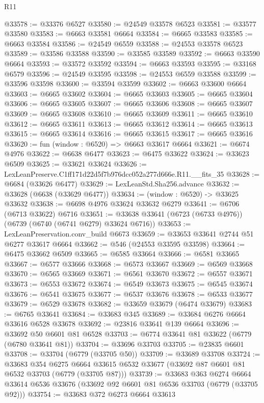 \begin{lexlean}{R11}
\begin{coremodule}
@33578 := @33376 @6527
@33580 := @24549 @33578 @6523
@33581 := @33577 @33580
@33583 := @6663 @33581 @6664
@33584 := @6665 @33583
@33585 := @6663 @33584
@33586 := @24549 @6559
@33588 := @24553 @33578 @6523
@33589 := @33586 @33588
@33590 := @33585 @33589
@33592 := @6663 @33590 @6664
@33593 := @33572 @33592
@33594 := @6663 @33593
@33595 := @33168 @6579
@33596 := @24549 @33595
@33598 := @24553 @6559 @33588
@33599 := @33596 @33598
@33600 := @33594 @33599
@33602 := @6663 @33600 @6664
@33603 := @6665 @33602
@33604 := @6665 @33603
@33605 := @6665 @33604
@33606 := @6665 @33605
@33607 := @6665 @33606
@33608 := @6665 @33607
@33609 := @6665 @33608
@33610 := @6665 @33609
@33611 := @6665 @33610
@33612 := @6665 @33611
@33613 := @6665 @33612
@33614 := @6665 @33613
@33615 := @6665 @33614
@33616 := @6665 @33615
@33617 := @6665 @33616
@33620 := fun (window : @6520) => @6663 @33617 @6664
@33621 := @6674 @4976
@33622 := @6638 @6477
@33623 := @6475 @33622
@33624 := @33623 @6509
@33625 := @33621 @33624
@33626 := LexLeanPreserve.C1ff171d22d5f7b976dcc052a277d666e.R11.__fits_35
@33628 := @6684 (@33626 @6477)
@33629 := LexLeanStd.Sha256.advance
@33632 := @33628 (@6638 (@33629 @6477))
@33634 := (window : @6520) -> @33625 @33632
@33638 := @6698 @4976 @33624 @33632 @6279
@33641 := @6706 (@6713 @33622) @6716
@33651 := @33638 @33641 (@6723 (@6733 @4976)) (@6739 (@6740 (@6741 @6279) @33624 @6716))
@33653 := LexLeanPreservation.conv_build @6673
@33659 := @33653 @33641 @2744 @51 @6277 @33617 @6664
@33662 := @546 (@24553 @33595 @33598)
@33664 := @6475 @33662 @6509
@33665 := @6585 @33664
@33666 := @6581 @33665
@33667 := @6577 @33666
@33668 := @6573 @33667
@33669 := @6569 @33668
@33670 := @6565 @33669
@33671 := @6561 @33670
@33672 := @6557 @33671
@33673 := @6553 @33672
@33674 := @6549 @33673
@33675 := @6545 @33674
@33676 := @6541 @33675
@33677 := @6537 @33676
@33678 := @6533 @33677
@33679 := @6529 @33678
@33682 := @33659 @33679 (@6474 @33679)
@33683 := @6765 @33641
@33684 := @33683 @345
@33689 := @33684 @6276 @6664 @33616 @6528 @33678
@33692 := @23816 @33641 @139 @6664
@33696 := @33692 @50 @6601 @81 @6528
@33703 := @6774 @33641 @81 @33622 (@6779 (@6780 @33641 @81))
@33704 := @33696 @33703
@33705 := @23835 @6601
@33708 := @33704 (@6779 (@33705 @50))
@33709 := @33689 @33708
@33724 := @33683
    @354
    @6275
    @6664
    @33615
    @6532
    @33677
    (@33692 @87 @6601 @81 @6532 @33703 (@6779 (@33705 @87)))
@33739 := @33683
    @363
    @6274
    @6664
    @33614
    @6536
    @33676
    (@33692 @92 @6601 @81 @6536 @33703 (@6779 (@33705 @92)))
@33754 := @33683
    @372
    @6273
    @6664
    @33613

\end{coremodule}
\end{lexlean}
